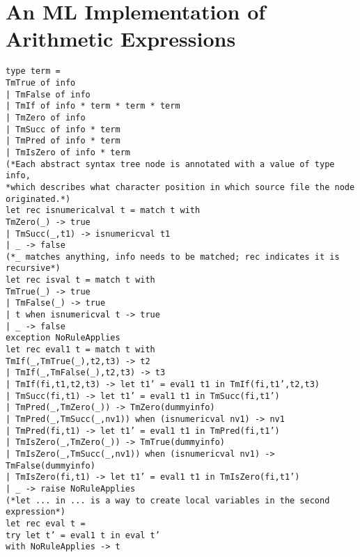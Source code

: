 \documentclass{article}
\begin{document}
\section{An ML Implementation of Arithmetic Expressions}
\texttt{type term =\\
    TmTrue of info\\
  | TmFalse of info\\
  | TmIf of info * term * term * term\\
  | TmZero of info\\
  | TmSucc of info * term\\
  | TmPred of info * term\\
  | TmIsZero of info * term\\
(*Each abstract syntax tree node is annotated with a value of type info, \\
 *which describes what character position in which source file the node originated.*)\\
let rec isnumericalval t = match t with\\
    TmZero(\_) -> true\\
  | TmSucc(\_,t1) -> isnumericval t1 \\
  | \_ -> false\\
(*\_ matches anything, info needs to be matched; rec indicates it is recursive*)\\
let rec isval t = match t with\\
    TmTrue(\_) -> true\\
  | TmFalse(\_) -> true\\
  | t when isnumericval t -> true\\
  | \_ -> false\\
exception NoRuleApplies\\
let rec eval1 t = match t with\\
    TmIf(\_,TmTrue(\_),t2,t3) -> t2\\
  | TmIf(\_,TmFalse(\_),t2,t3) -> t3\\
  | TmIf(fi,t1,t2,t3) -> let t1' = eval1 t1 in TmIf(fi,t1',t2,t3)\\
  | TmSucc(fi,t1) -> let t1' = eval1 t1 in TmSucc(fi,t1')\\
  | TmPred(\_,TmZero(\_)) -> TmZero(dummyinfo)\\
  | TmPred(\_,TmSucc(\_,nv1)) when (isnumericval nv1) -> nv1\\
  | TmPred(fi,t1) -> let t1' = eval1 t1 in TmPred(fi,t1')\\
  | TmIsZero(\_,TmZero(\_)) -> TmTrue(dummyinfo)\\
  | TmIsZero(\_,TmSucc(\_,nv1)) when (isnumericval nv1) -> TmFalse(dummyinfo)\\
  | TmIsZero(fi,t1) -> let t1' = eval1 t1 in TmIsZero(fi,t1')\\
  | \_ -> raise NoRuleApplies\\
(*let ... in ... is a way to create local variables in the second expression*)\\
let rec eval t = \\
  try let t' = eval1 t in eval t'\\
  with NoRuleApplies -> t\\
}
\pagebreak
\end{document}
